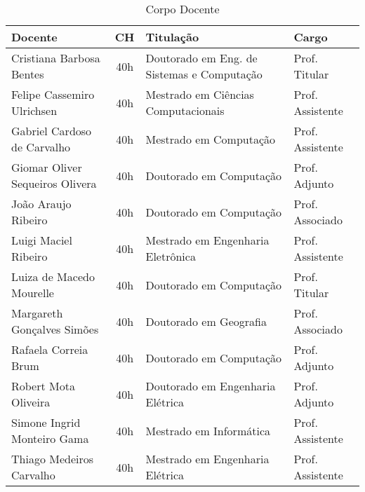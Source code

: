 \begin{table}
	\centering
	\caption{Corpo Docente}
	\label{CorpoDocente}
	\begin{tabular}{|l|c|l|l|}
		\hline
		{\textbf{Docente}}                   & \textbf{CH} & \textbf{Titulação}                         & \textbf{Cargo}  \\
		\hline
		Cristiana Barbosa Bentes             & 40h         & Doutorado em Eng. de Sistemas e Computação & Prof. Titular \\
		Felipe Cassemiro Ulrichsen	         & 40h         & Mestrado em Ciências Computacionais      	& Prof. Assistente\\
		Gabriel Cardoso de Carvalho          & 40h         & Mestrado em Computação                     & Prof. Assistente\\
		Giomar Oliver Sequeiros Olivera      & 40h         & Doutorado em Computação                    & Prof. Adjunto   \\
		João Araujo Ribeiro                  & 40h         & Doutorado em Computação                    & Prof. Associado \\
		Luigi Maciel Ribeiro 	             & 40h         & Mestrado em Engenharia Eletrônica          & Prof. Assistente \\
		Luiza de Macedo Mourelle             & 40h         & Doutorado em Computação                    & Prof. Titular \\
		Margareth Gonçalves Simões           & 40h         & Doutorado em Geografia                     & Prof. Associado \\
		Rafaela Correia Brum		         & 40h         & Doutorado em Computação                    & Prof. Adjunto   \\	
		Robert Mota Oliveira		         & 40h         & Doutorado em Engenharia Elétrica           & Prof. Adjunto   \\	
		Simone Ingrid Monteiro Gama		     & 40h         & Mestrado em Informática             		& Prof. Assistente\\	
		Thiago Medeiros Carvalho		     & 40h         & Mestrado em Engenharia Elétrica            & Prof. Assistente\\	
		\hline
	\end{tabular}
\end{table}

